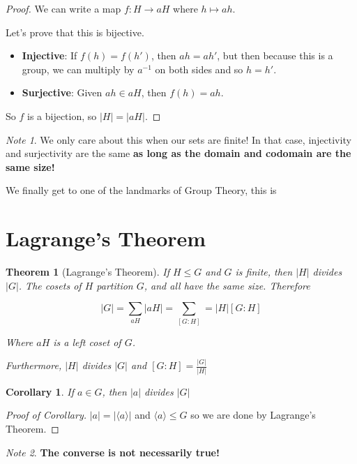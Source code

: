 \documentclass[12pt]{article}
\newcommand{\lr}[1]{\langle #1 \rangle}
\newtheorem{theorem}{Theorem}
\newtheorem{corollary}{Corollary}
\theoremstyle{remark}
\theoremstyle{remark}
\theoremstyle{remark}
\theoremstyle{remark}
\theoremstyle{remark}
\newtheorem*{note}{Note}
\begin{document}
\begin{proof}
  We can write a map $f: H \to aH$ where $h \mapsto ah$.

  Let's prove that this is bijective.

  \begin{itemize}
    \item {\bf Injective}: If $f(h) = f(h')$, then $ah = ah'$, but then because
      this is a group, we can multiply by $a^{-1}$ on both sides and so $h = h'$.

    \item {\bf Surjective}: Given $ah \in aH$, then $f(h) = ah$.
  \end{itemize}

  So $f$ is a bijection, so $|H| = |aH|$.
\end{proof}

\begin{note}
  We only care about this when our sets are finite! In that case, injectivity
  and surjectivity are the same {\bf as long as the domain and codomain are the same
  size!}
\end{note}

We finally get to one of the landmarks of Group Theory, this is

\section{Lagrange's Theorem}
\begin{theorem}[Lagrange's Theorem]
  If $H \le G$ and $G$ is finite, then $|H|$ divides $|G|$. The cosets of $H$
  partition $G$, and all have the same size. Therefore

  \[
    |G| = \sum_{aH} |aH| = \sum_{[G : H]} = |H| [G : H]
  \]

  Where $aH$ is a left coset of $G$.

  Furthermore, $|H|$ divides $|G|$ and $[G : H] = \frac{|G|}{|H|}$
\end{theorem}

\begin{corollary}
  If $a \in G$, then $|a|$ divides $|G|$
\end{corollary}
\begin{proof}[Proof of Corollary]
  $|a| = |\lr {a}|$ and $\lr {a} \le G$ so we are done by Lagrange's Theorem.
\end{proof}

\begin{note}
  {\bf The converse is not necessarily true!}
\end{note}
\end{document}
